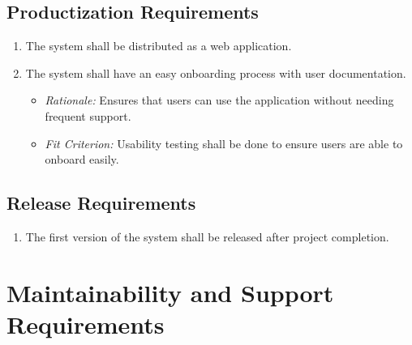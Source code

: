 \documentclass[12pt]{article}
\begin{document}
\subsection{Productization Requirements}
\begin{enumerate}
  \item The system shall be distributed as a web application.
  \item The system shall have an easy onboarding process with user documentation.
  \begin{itemize}
    \item \textit{Rationale:} Ensures that users can use the application without needing frequent support.
    \item \textit{Fit Criterion:} Usability testing shall be done to ensure users are able to onboard easily.
  \end{itemize}
\end{enumerate}

\subsection{Release Requirements}
\begin{enumerate}
  \item The first version of the system shall be released after project completion.
\end{enumerate}

\section{Maintainability and Support Requirements}
\end{document}
